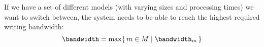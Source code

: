 If we have a set of different models (with varying sizes and processing times) we want to switch between, the system needs to be able to reach the highest required writing bandwidth:
\begin{equation}
    \bandwidth = \max\{\,m \in M \mid \bandwidth_m \,\} 
\end{equation}
